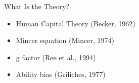 \documentclass{beamer} %
\begin{document}
\begin{frame}{What Is the Theory?}
  \begin{itemize}
    \item Human Capital Theory \hfill (Becker, 1962)
    \item Mincer equation \hfill (Mincer, 1974)
    \item g factor \hfill (Ree et al., 1994)
    \item Ability bias \hfill (Griliches, 1977)
  \end{itemize}
\end{frame}

\end{document}
